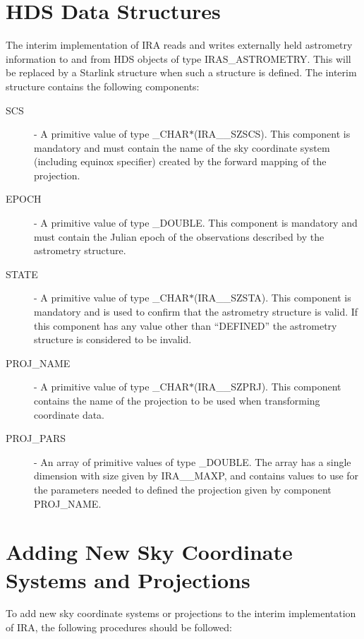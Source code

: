 \section {HDS Data Structures}
The interim implementation of IRA reads and writes externally held astrometry
information to and from HDS objects of type IRAS\_ASTROMETRY. This will be
replaced by a Starlink structure when such a structure is defined. The interim
structure contains the following components:
\begin {description}

\item [SCS] - A primitive value of type \_CHAR$*$(IRA\_\_SZSCS). This component
is mandatory and must contain the name of the sky coordinate system (including
equinox specifier) created by the forward mapping of the projection.

\item [EPOCH] - A primitive value of type \_DOUBLE. This component
is mandatory and must contain the Julian epoch of the observations described by
the astrometry structure.

\item [STATE] - A primitive value of type \_CHAR$*$(IRA\_\_SZSTA). This
component is mandatory and is used to confirm that the astrometry structure is
valid. If this component has any value other than ``DEFINED'' the astrometry
structure is considered to be invalid.

\item [PROJ\_NAME] - A primitive value of type \_CHAR$*$(IRA\_\_SZPRJ). This
component contains the name of the projection to be used when transforming
coordinate data.

\item [PROJ\_PARS] - An array of primitive values of type \_DOUBLE. The array
has a single dimension with size given by IRA\_\_MAXP, and contains values to
use for the parameters needed to defined the projection given by component
PROJ\_NAME.

\end {description}

\section {Adding New Sky Coordinate Systems and Projections}
To add new sky coordinate systems or projections to the interim implementation
of IRA, the following procedures should be followed:

